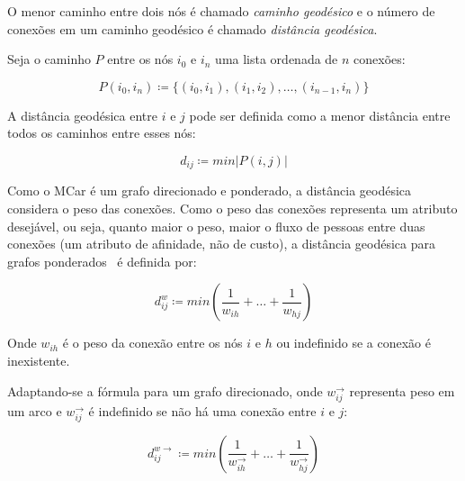\documentclass[12pt,a4paper]{article}
\theoremstyle{hypo}
\newcommand{\defn}{\coloneqq} %
\newcommand{\wout}{w^\rightarrow} %
\newcommand{\weighted}[1]{#1^w} %
\newcommand{\weighteddir}[1]{#1^{w\rightarrow}} %
\begin{document}
O menor caminho entre dois nós é chamado \textit{caminho geodésico} e o número de conexões em um caminho geodésico é chamado \textit{distância geodésica}.

Seja o caminho $P$ entre os nós $i_0$ e $i_n$ uma lista ordenada de $n$ conexões:

\begin{equation} \label{eq:caminho}
P(i_0,i_n) \defn \{(i_0,i_1), (i_1,i_2), \ldots, (i_{n-1},i_n)\}
\end{equation}

A distância geodésica entre $i$ e $j$ pode ser definida como a menor distância entre todos os caminhos entre esses nós:

\begin{equation} \label{eq:distancia-geodesica}
d_{ij} \defn min|P(i, j)| 
\end{equation}

Como o MCar é um grafo direcionado e ponderado, a distância geodésica considera o peso das conexões. Como o peso das conexões representa um atributo desejável, ou seja, quanto maior o peso, maior o fluxo de pessoas entre duas conexões (um atributo de afinidade, não de custo),  a distância geodésica para grafos ponderados~\cite{Newman2001-sl} é definida por:

\begin{equation} \label{eq:distancia-ponderada}
\weighted{d}_{ij} \defn min\left(\frac{1}{w_{ih}} + \ldots + \frac{1}{w_{hj}}\right)
\end{equation}

Onde $w_{ih}$ é o peso da conexão entre os nós $i$ e $h$ ou indefinido se a conexão é inexistente.

Adaptando-se a fórmula para um grafo direcionado, onde $\wout_{ij}$ representa peso em um arco e $\wout_{ij}$ é indefinido se não há uma conexão entre $i$ e $j$:

\begin{equation} \label{eq:distancia-ponderada-direcionada}
\weighteddir{d}_{ij} \defn min\left(\frac{1}{\wout_{ih}} + \ldots + \frac{1}{\wout_{hj}}\right)
\end{equation}
\end{document}
